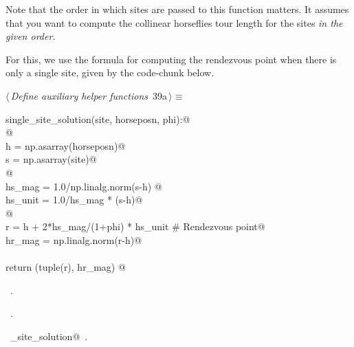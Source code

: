 \documentclass[11.5pt]{report}
\begin{document}
Note that the order in which sites are passed to this function matters. It 
assumes that you want to compute the collinear horseflies tour length for the 
sites \textit{in the given order.} 

For this, we use the formula for computing the rendezvous point when there is 
only a single site, given by the code-chunk below. 


\begin{flushleft} \small\label{scrap55}\raggedright\small
{} $\langle\,${\itshape Define auxiliary helper functions}\nobreak\ {\footnotesize {39a}}$\,\rangle\equiv$
\vspace{-1ex}
\begin{list}{}{} \item
\mbox{}\verb@def single_site_solution(site, horseposn, phi):@\\
\mbox{}\verb@     @\\
\mbox{}\verb@     h = np.asarray(horseposn)@\\
\mbox{}\verb@     s = np.asarray(site)@\\
\mbox{}\verb@     @\\
\mbox{}\verb@     hs_mag  = 1.0/np.linalg.norm(s-h) @\\
\mbox{}\verb@     hs_unit = 1.0/hs_mag * (s-h)@\\
\mbox{}\verb@     @\\
\mbox{}\verb@     r      = h +  2*hs_mag/(1+phi) * hs_unit # Rendezvous point@\\
\mbox{}\verb@     hr_mag = np.linalg.norm(r-h)@\\
\mbox{}\verb@@\\
\mbox{}\verb@     return (tuple(r), hr_mag) @\\
\mbox{}\verb@@{\NWsep}
\end{list}
\vspace{-1.5ex}
\footnotesize
\begin{list}{}{\setlength{\itemsep}{-\parsep}\setlength{\itemindent}{-\leftmargin}}
\item \NWtxtMacroDefBy\ .
\item \NWtxtMacroRefIn\ .
\item \NWtxtIdentsDefed\nobreak\  \verb@single_site_solution@\nobreak\ .
\item{}
\end{list}
\vspace{4ex}
\end{flushleft}
\end{document}
